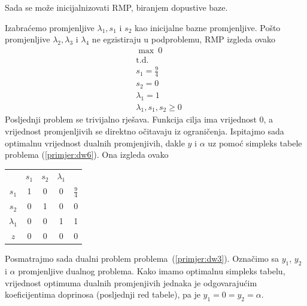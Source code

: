 \documentclass[a4paper, utf8, 11pt, colorlinks]{book}
\theoremstyle{definition}
\begin{document}
Sada se može inicijalnizovati RMP, biranjem dopustive baze.

Izabraćemo promjenljive $\lambda_1, s_1$ i $s_2$ kao inicijalne bazne promjenljive. Pošto  promjenljive $\lambda_2,\lambda_3$ i $\lambda_4$ ne egzistiraju u podproblemu,  RMP izgleda ovako
      \begin{equation}
	\begin{aligned}\label{primjer:dw6}
		&\max\   0\\
		&\mbox{t.d.}\\  
		&s_1=\frac 94\\
		&s_2=0\\
		&\lambda_1 = 1\\
		&\lambda_1,s_1,s_2\geqslant 0
	\end{aligned}
\end{equation}
Posljednji problem se trivijalno rješava. Funkcija cilja ima vrijednost 0, a vrijednost promjenljivih se direktno očitavaju iz ograničenja. Ispitajmo sada optimalnu vrijednost dualnih promjenjivih, dakle $y$ i $\alpha$ uz pomoć simpleks tabele problema (\ref{primjer:dw6}). Ona izgleda ovako
\begin{center}

\begin{tabular}{c|cccc}
	       &$s_1$  & $ s_2$   & $\lambda_1$ &  \\
 $s_1$	   &  1  &   0      &   0         &  $\frac{9}{4}$ \\
  $s_2$	  &  0  &    1     &   0         &  0             \\
$\lambda_1$	  &  0  &    0     &   1         &  1   \\ \hline
	$z$   & 0  &    0     &   0         &  0
\end{tabular}
\end{center}
 
Posmatrajmo sada dualni problem problema~(\ref{primjer:dw3}). Označimo sa $y_1$, $y_2$ i $\alpha$ promjenljive dualnog problema. Kako imamo optimalnu simpleks tabelu, vrijednost optimuma dualnih promjenjivih jednaka je odgovarajućim koeficijentima doprinosa (posljednji red tabele), pa je $y_1 = 0 = y_2 = \alpha$. 

\end{document}
